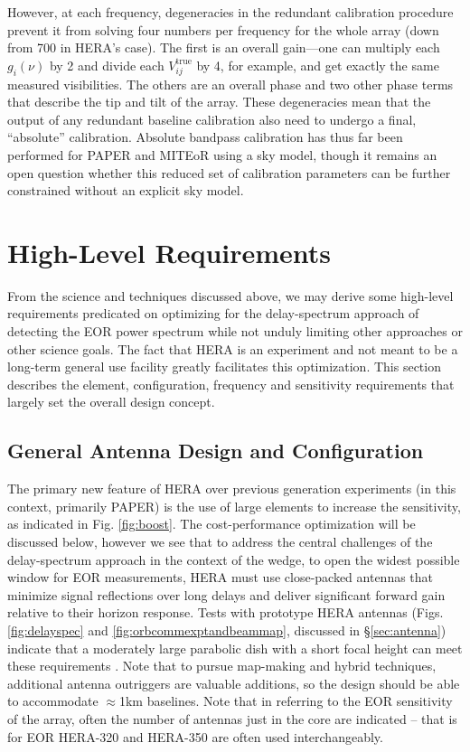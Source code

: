 \documentclass[preprint,11pt]{aastex}
\begin{document}
However, at each frequency, degeneracies in the redundant calibration procedure prevent it from solving four numbers per frequency for the whole array (down from 700 in HERA's case). The first is an overall gain---one can multiply each $g_i(\nu)$ by 2 and divide each $V_{ij}^\text{true}$ by 4, for example, and get exactly the same measured visibilities. The others are an overall phase and two other phase terms that describe the tip and tilt of the array. These degeneracies mean that the output of any redundant baseline calibration also need to undergo a final, ``absolute'' calibration. Absolute bandpass calibration has thus far been performed for PAPER and MITEoR using a sky model, though it remains an open question whether this reduced set of calibration parameters can be further constrained without an explicit sky model.


\section{High-Level Requirements} 
\label{sec:requirements}
From the science and techniques discussed above, we may derive some high-level requirements predicated on optimizing for the delay-spectrum approach of detecting the EOR power spectrum while not unduly limiting other approaches or other science goals.  The fact that HERA is an experiment and not meant to be a long-term general use facility greatly facilitates this optimization. This section describes the element, configuration, frequency and sensitivity requirements that largely set the overall design concept.

\subsection{General Antenna Design and Configuration}
The primary new feature of HERA over previous generation experiments (in this context, primarily PAPER) is the use of large elements to increase the sensitivity, as indicated in Fig. \ref{fig:boost}.  The cost-performance optimization will 
be discussed below, however we see that to address the central challenges of the delay-spectrum approach in the context of the wedge, to open the widest possible window for EOR measurements, 
HERA must use close-packed antennas that
minimize signal reflections over long delays and deliver significant forward gain relative to their horizon response.
Tests with prototype HERA antennas (Figs.  \ref{fig:delayspec} and \ref{fig:orbcommexptandbeammap}, discussed in \S\ref{sec:antenna})
indicate that a moderately large parabolic dish with a short focal height can meet these requirements
\citep{ewall-wice_et_al2016-EoXLimits,neben_et_al2016,thyagarajan_et_al2016}.  Note that to pursue map-making and hybrid techniques, additional antenna outriggers are valuable additions, so the design
should be able to accommodate $\approx$1km baselines.  Note that in referring to the EOR sensitivity of the array, often the number of antennas just in the core are
indicated -- that is for EOR HERA-320 and HERA-350 are often used interchangeably.
\end{document}
